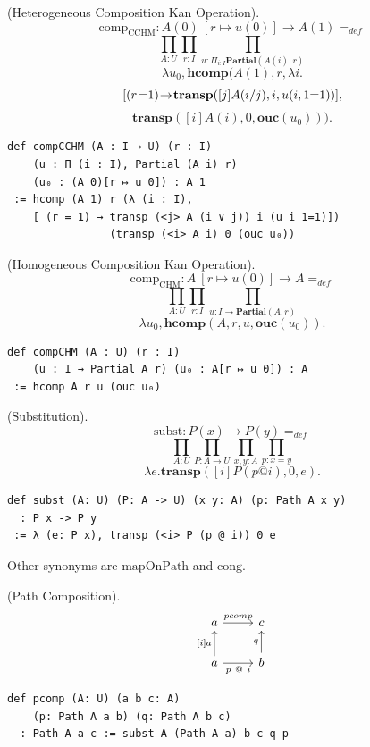 \documentclass{article}
\begin{document}
\begin{theorem} (Heterogeneous Composition Kan Operation).
$$
  \mathrm{comp}_{\mathrm{CCHM}} : A(0)\ [r \mapsto u(0)] \rightarrow A(1) =_{def}
$$
$$
  \prod_{A:U}\prod_{r:I} \prod_{u: \Pi_{i:I}\mathbf{Partial}(A(i),r)}
$$
$$
  \lambda u_0, \mathbf{hcomp}(A(1),r,\lambda i.
$$
$$
  [(r\hspace{0.1em}\mbox{=}1)\hspace{-0.2em}\rightarrow\hspace{-0.2em}\mathbf{transp}([j]A(i /\\ j),i,u(i,1\hspace{0em}\mbox{=}1)) ],
$$
$$
  \mathbf{transp}([i]A(i),0,\mathbf{ouc}(u_0))).
$$
\begin{lstlisting}[mathescape=true]
def compCCHM (A : I → U) (r : I)
    (u : Π (i : I), Partial (A i) r)
    (u₀ : (A 0)[r ↦ u 0]) : A 1
 := hcomp (A 1) r (λ (i : I),
    [ (r = 1) → transp (<j> A (i ∨ j)) i (u i 1=1)])
                (transp (<i> A i) 0 (ouc u₀))
\end{lstlisting}
\end{theorem}

\begin{theorem} (Homogeneous Composition Kan Operation).
$$
  \mathrm{comp}_{\mathrm{CHM}} : A\ [r \mapsto u(0)] \rightarrow A =_{def}
$$
$$
  \prod_{A:U}\prod_{r:I} \prod_{u:I\rightarrow \mathbf{Partial}(A,r)}
$$
$$
  \lambda u_0, \mathbf{hcomp}(A,r,u,\mathbf{ouc}(u_0)).
$$
\begin{lstlisting}[mathescape=true]
def compCHM (A : U) (r : I)
    (u : I → Partial A r) (u₀ : A[r ↦ u 0]) : A
 := hcomp A r u (ouc u₀)
\end{lstlisting}
\end{theorem}

\begin{theorem} (Substitution).
$$
  \mathrm{subst} : P(x) \rightarrow P(y) =_{def}
$$
$$
  \prod_{A:U}\prod_{P:A\rightarrow U}\prod_{x,y:A}\prod_{p:x=y}
$$
$$
  \lambda e.\mathbf{transp}([i] P (p @ i),0,e).
$$
\begin{lstlisting}[mathescape=true]
def subst (A: U) (P: A -> U) (x y: A) (p: Path A x y)
  : P x -> P y
 := λ (e: P x), transp (<i> P (p @ i)) 0 e
\end{lstlisting}
\end{theorem}

Other synonyms are $\mathrm{mapOnPath}$ and $\mathrm{cong}$.

\newpage
\begin{theorem} (Path Composition).
$$
\begin{tikzcd}
  a \arrow[r, "pcomp"] & c \\
  a \arrow[u, "{[i]a}"] \arrow[r, "p\ @\ i"'] & b \arrow[u, "q"]
\end{tikzcd}
$$
\begin{lstlisting}[mathescape=true]
def pcomp (A: U) (a b c: A)
    (p: Path A a b) (q: Path A b c)
  : Path A a c := subst A (Path A a) b c q p
\end{lstlisting}
\end{theorem}
\end{document}
